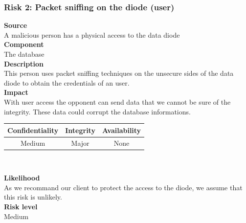 \documentclass[a4paper,11pt]{article}
\begin{document}
\subsubsection{Risk 2: Packet sniffing on the diode (user) }
\textbf{Source} \\A malicious person has a physical access to the data diode\\
\textbf{Component} \\The database\\
\textbf{Description}\\ This person uses packet sniffing techniques on the unsecure sides of the data diode to obtain the credentials of an user. \\
\textbf{Impact}\\
With user access the opponent can send data that we cannot be sure of the integrity. These data could corrupt the database informations.\\
\begin{center}

\begin{tabular}{|c|c|c|}
\hline
\textbf{Confidentiality} & \textbf{Integrity} & \textbf{Availability} \\
\hline
Medium & Major & None \\
\hline
\end{tabular}\\
\end{center}
\textbf{Likelihood}\\ As we recommand our client to protect the access to the diode, we assume that this risk is unlikely.\\
\textbf{Risk level}\\Medium\\
\end{document}
